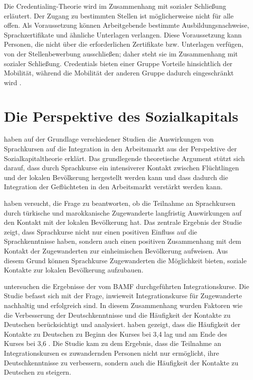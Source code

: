 Die Credentialing-Theorie wird im Zusammenhang mit sozialer Schließung erläutert. Der Zugang zu bestimmten Stellen ist möglicherweise nicht für alle offen. Als Voraussetzung können Arbeitgebende bestimmte Ausbildungsnachweise, Sprachzertifikate und ähnliche Unterlagen verlangen. Diese Voraussetzung kann Personen, die nicht über die erforderlichen Zertifikate bzw. Unterlagen verfügen, von der Stellenbewerbung ausschließen; daher steht sie im Zusammenhang mit sozialer Schließung. Credentials bieten einer Gruppe Vorteile hinsichtlich der Mobilität, während die Mobilität der anderen Gruppe dadurch eingeschränkt wird \parencite[31--34]{collins1979credential}.



\section{Die Perspektive des Sozialkapitals}
\label{cha:sozialkapital}

\textcite{Kanas:2023} haben auf der Grundlage verschiedener Studien die Auswirkungen von Sprachkursen auf die Integration in den Arbeitsmarkt aus der Perspektive der Sozialkapitaltheorie erklärt. Das grundlegende theoretische Argument stützt sich darauf, dass durch Sprachkurse ein intensiverer Kontakt zwischen Flüchtlingen und der lokalen Bevölkerung hergestellt werden kann und dass dadurch die Integration der Geflüchteten in den Arbeitsmarkt verstärkt werden kann.

\textcite{doi:10.1111/imre.12130} haben versucht, die Frage zu beantworten, ob die Teilnahme an Sprachkursen durch türkische und marokkanische Zugewanderte langfristig Auswirkungen auf den Kontakt mit der lokalen Bevölkerung hat. Das zentrale Ergebnis der Studie zeigt, dass Sprachkurse nicht nur einen positiven Einfluss auf die Sprachkenntnisse haben, sondern auch einen positiven Zusammenhang mit dem Kontakt der Zugewanderten zur einheimischen Bevölkerung aufweisen. Aus diesem Grund können Sprachkurse Zugewanderten die Möglichkeit bieten, soziale Kontakte zur lokalen Bevölkerung aufzubauen.

\textcite{schuller2011integrationspanel} untersuchen die Ergebnisse der vom BAMF durchgeführten Integrationskurse. Die Studie befasst sich mit der Frage, inwieweit Integrationskurse für Zugewanderte nachhaltig und erfolgreich sind. In diesem Zusammenhang wurden Faktoren wie die Verbesserung der Deutschkenntnisse und die Häufigkeit der Kontakte zu Deutschen berücksichtigt und analysiert. \textcite{schuller2011integrationspanel} haben gezeigt, dass die Häufigkeit der Kontakte zu Deutschen zu Beginn des Kurses bei 3,4 lag und am Ende des Kurses bei 3,6 \parencite[233]{schuller2011integrationspanel}. Die Studie kam zu dem Ergebnis, dass die Teilnahme an Integrationskursen es zuwandernden Personen nicht nur ermöglicht, ihre Deutschkenntnisse zu verbessern, sondern auch die Häufigkeit der Kontakte zu Deutschen zu steigern.

